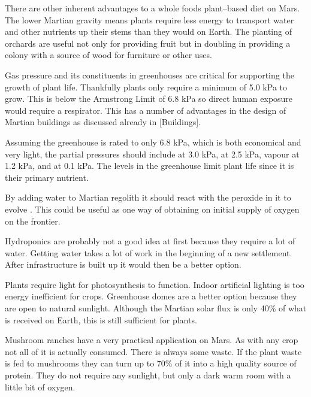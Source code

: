 There are other inherent advantages to a whole foods plant--based diet on Mars. The lower Martian gravity means plants require less energy to transport water and other nutrients up their stems than they would on Earth. The planting of orchards are useful not only for providing fruit but in doubling in providing a colony with a source of wood for furniture or other uses.

Gas pressure and its constituents in greenhouses are critical for supporting the growth of plant life. Thankfully plants only require a minimum of 5.0 kPa to grow. This is below the Armstrong Limit of 6.8 kPa so direct human exposure would require a respirator. This has a number of advantages in the design of Martian buildings as discussed already in [Buildings].

Assuming the greenhouse is rated to only 6.8 kPa, which is both economical and very light, the partial pressures should include  at 3.0 kPa,  at 2.5 kPa,  vapour at 1.2 kPa, and  at 0.1 kPa. The  levels in the greenhouse limit plant life since it is their primary nutrient. 

By adding water to Martian regolith it should react with the peroxide in it to evolve . This could be useful as one way of obtaining on initial supply of oxygen on the frontier.

Hydroponics are probably not a good idea at first because they require a lot of water. Getting water takes a lot of work in the beginning of a new settlement. After infrastructure is built up it would then be a better option.

Plants require light for photosynthesis to function. Indoor artificial lighting is too energy inefficient for crops. Greenhouse domes are a better option because they are open to natural sunlight. Although the Martian solar flux is only 40\% of what is received on Earth, this is still sufficient for plants.

Mushroom ranches have a very practical application on Mars. As with any crop not all of it is actually consumed. There is always some waste. If the plant waste is fed to mushrooms they can turn up to 70\% of it into a high quality source of protein. They do not require any sunlight, but only a dark warm room with a little bit of oxygen.


